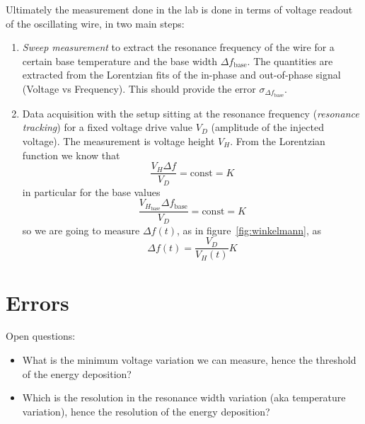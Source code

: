 \documentclass[a4paper,10pt]{article}
\begin{document}
Ultimately the measurement done in the lab is done in terms of voltage readout of the oscillating wire, in two main steps:
\begin{enumerate}

  \item \textit{Sweep measurement} to extract the resonance frequency of the wire for a certain base temperature and the base width $\Delta f_\mathrm{base}$. The quantities are extracted from the Lorentzian fits of the in-phase and out-of-phase signal (Voltage vs Frequency). This should provide the error $\sigma_{\Delta f_\mathrm{base}}$.
  \item Data acquisition with the setup sitting at the resonance frequency (\textit{resonance tracking}) for a fixed voltage drive value $V_D$ (amplitude of the injected voltage). The measurement is voltage height $V_H$. From the Lorentzian function we know that
  \begin{equation}
    \frac{V_H\Delta f}{V_D} = \mathrm{const} = K
  \end{equation}
in particular for the base values
  \begin{equation}
    \frac{V_{H_\mathrm{base}}\Delta f_\mathrm{base}}{V_D} = \mathrm{const} = K
  \end{equation}
so we are going to measure $\Delta f(t)$, as in figure~\ref{fig:winkelmann}, as
  \begin{equation}
    \Delta f(t) = \frac{V_D}{V_H(t)}K
  \end{equation}
  
\end{enumerate}




\section{Errors}

Open questions:
\begin{itemize}

  \item What is the minimum voltage variation we can measure, hence the threshold of the energy deposition? 
  \item Which is the resolution in the resonance width variation (aka temperature variation), hence the resolution of the energy deposition?

\end{itemize}
\end{document}
